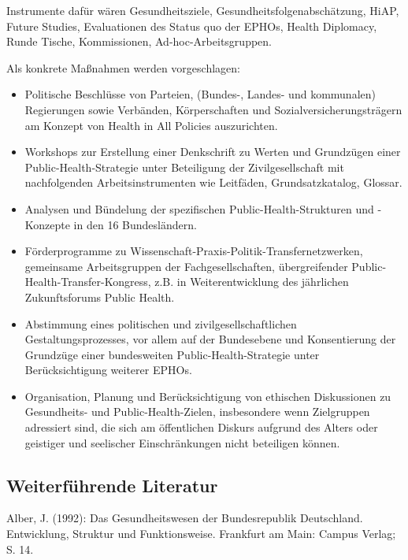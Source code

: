 \documentclass{article}
\begin{document}
Instrumente dafür wären Gesundheitsziele, Gesundheitsfolgenabschätzung, HiAP, Future Studies, Evaluationen des Status quo der EPHOs, Health Diplomacy, Runde Tische, Kommissionen, Ad-hoc-Arbeitsgruppen.


Als konkrete Maßnahmen werden vorgeschlagen:

\begin{itemize}
\item Politische Beschlüsse von Parteien, (Bundes-, Landes- und kommunalen) Regierungen sowie Verbänden, Körperschaften und Sozialversicherungsträgern am Konzept von Health in All Policies auszurichten.


\item Workshops zur Erstellung einer Denkschrift zu Werten und Grundzügen einer Public-Health-Strategie unter Beteiligung der Zivilgesellschaft mit nachfolgenden Arbeitsinstrumenten wie Leitfäden, Grundsatzkatalog, Glossar.


\item Analysen und Bündelung der spezifischen Public-Health-Strukturen und -Konzepte in den 16 Bundesländern.


\item Förderprogramme zu Wissenschaft-Praxis-Politik-Transfernetzwerken, gemeinsame Arbeitsgruppen der Fachgesellschaften, übergreifender Public-Health-Transfer-Kongress, z.B. in Weiterentwicklung des jährlichen Zukunftsforums Public Health.


\item Abstimmung eines politischen und zivilgesellschaftlichen Gestaltungsprozesses, vor allem auf der Bundesebene und Konsentierung der Grundzüge einer bundesweiten Public-Health-Strategie unter Berücksichtigung weiterer EPHOs.


\item Organisation, Planung und Berücksichtigung von ethischen Diskussionen zu Gesundheits- und Public-Health-Zielen, insbesondere wenn Zielgruppen adressiert sind, die sich am öffentlichen Diskurs aufgrund des Alters oder geistiger und seelischer Einschränkungen nicht beteiligen können.


\end{itemize}

\subsection{Weiterführende Literatur}\label{H4924658}



Alber, J. (1992): Das Gesundheitswesen der Bundesrepublik Deutschland. Entwicklung, Struktur und Funktionsweise. Frankfurt am Main: Campus Verlag; S. 14.
\end{document}
